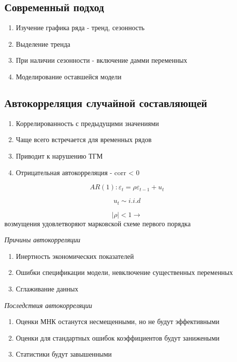 \documentclass[a4paper, 12pt]{article}
\begin{document}
\subsection{Современный подход}

\begin{enumerate}
    \item Изучение графика ряда - тренд, сезонность
    \item Выделение тренда
    \item При наличии сезонности - включение дамми переменных
    \item Моделирование оставшейся модели
\end{enumerate}

\subsection{Автокорреляция случайной составляющей}

\begin{enumerate}
    \item Коррелированность с предыдущими значениями
    \item Чаще всего встречается для временных рядов
    \item Приводит к нарушению ТГМ
    \item Отрицательная автокорреляция - corr < 0
\end{enumerate}

\[AR(1): \varepsilon_{t} = \rho \varepsilon_{t - 1} + u_{t}\]

\[u_{t} \sim i.i.d\]

\[|\rho| < 1 \rightarrow\] возмущения удовлетворяют марковской схеме первого порядка

\begin{center}
    \textit{Причины автокорреляции}
\end{center}

\begin{enumerate}
    \item Инертность экономических показателей
    \item Ошибки спецификации модели, невключение существенных переменных
    \item Сглаживание данных
\end{enumerate}

\begin{center}
    \textit{Последствия автокорреляции}
\end{center}

\begin{enumerate}
    \item Оценки МНК останутся несмещенными, но не будут эффективными
    \item Оценки для стандартных ошибок коэффициентов будут занижеными
    \item Статистики будут завышенными
\end{enumerate}
\end{document}

